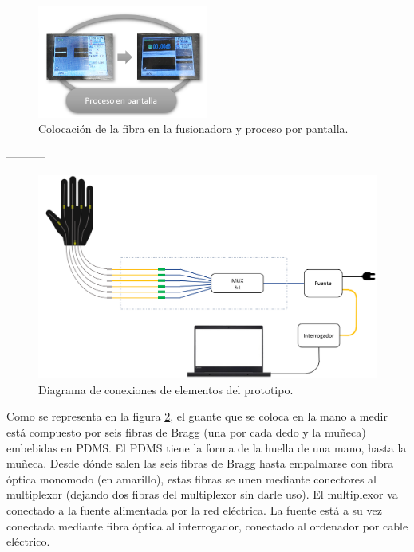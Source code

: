 \begin{itemize}
	\begin{figure}[H]
		\centering
		\includegraphics[width=0.5\textwidth]{./img/procesoPantalla}
		\caption{Colocación de la fibra en la fusionadora y proceso por pantalla. } 
		\label{fig:procesoPantalla}
	\end{figure}  
	
	-----------
	
	\begin{figure}[H]
		\centering
		\includegraphics[width=1\textwidth]{./img/diagramaFBG}
		\caption{Diagrama de conexiones de elementos del prototipo.} \label{fig:diagramaFBG}
	\end{figure}
	
	
	Como se representa en la figura \ref{fig:diagramaFBG}, el guante que se coloca en la mano a medir está compuesto por seis fibras de Bragg (una por cada dedo y la muñeca) embebidas en PDMS. El PDMS tiene la forma de la huella de una mano, hasta la muñeca. Desde dónde salen las seis fibras de Bragg hasta empalmarse con fibra óptica monomodo (en amarillo), estas fibras se unen mediante conectores al multiplexor (dejando dos fibras del multiplexor sin darle uso). El multiplexor va conectado a la fuente alimentada por la red eléctrica. La fuente está a su vez conectada mediante fibra óptica al interrogador, conectado al ordenador por cable eléctrico.
	
	
	
	
\end{itemize}

